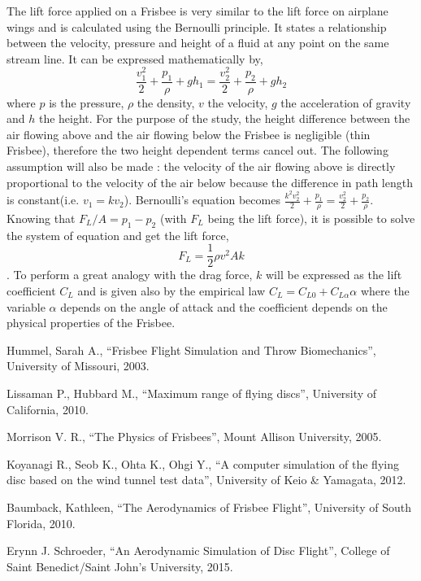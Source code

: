 \documentclass[10pt,a4paper]{report}
\begin{document}
The lift force applied on a Frisbee is very similar to the lift force on
airplane wings and is calculated using the Bernoulli principle. It states a relationship between the velocity, pressure and height of a fluid at any point on the same stream line. It can be expressed mathematically by,
\[\frac{v_1^2}{2} + \frac{p_1}{\rho} + gh_1 = \frac{v_2^2}{2} + \frac{p_2}{\rho} + gh_2\]
where $p$ is the pressure, $\rho$ the density, $v$ the velocity, $g$ the acceleration of gravity and $h$ the height. For the purpose of the study, the height difference between the air flowing above and the air flowing below the Frisbee is negligible (thin Frisbee), therefore the two height dependent terms cancel out. The following assumption will also be made : the velocity of the air flowing above is directly proportional to the velocity of the air below because the difference in path length is constant(i.e. $v_1 = kv_2$). Bernoulli's equation becomes $\frac{k^2v_2^2}{2} + \frac{p_1}{\rho} = \frac{v_2^2}{2} + \frac{p_2}{\rho}$. Knowing that $F_L/A = p_1 - p_2$ (with $F_L$ being the lift force), it is possible to solve the system of equation and get the lift force,
\[F_L = \frac{1}{2} \rho v^2 A k \].
To perform a great analogy with the drag force, $k$ will be expressed as the lift coefficient $C_L$ and is given also by the empirical law $C_L = C_{L0} + C_{L \alpha} \alpha$ where the variable $\alpha$ depends on the angle of attack and the coefficient depends on the physical properties of the Frisbee.

\begin{thebibliography}{9}

  Hummel, Sarah A.,
  “Frisbee Flight Simulation and Throw Biomechanics”,
  University of Missouri,
  2003.
  
  Lissaman P., Hubbard M.,
  “Maximum range of flying discs”,
  University of California,
  2010.
  
  Morrison V. R.,
  “The Physics of Frisbees”,
  Mount Allison University,
  2005.

  Koyanagi R., Seob K., Ohta K., Ohgi Y.,
  “A computer simulation of the flying disc based on the wind tunnel test data”,
  University of Keio \& Yamagata,
  2012.
  
  Baumback, Kathleen,
  “The Aerodynamics of Frisbee Flight”,
  University of South Florida,
  2010.
  
  Erynn J. Schroeder,
  “An Aerodynamic Simulation of Disc Flight”,
  College of Saint Benedict/Saint John's University,
  2015.

\end{thebibliography}
\end{document}
